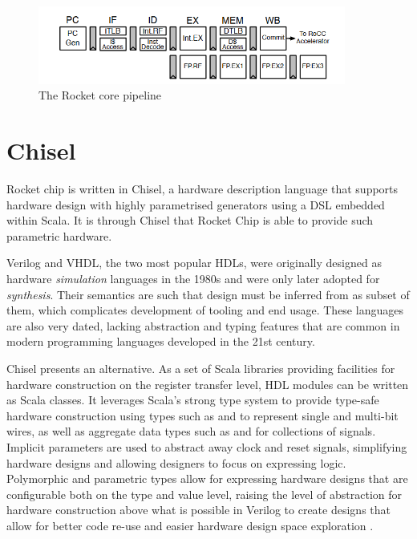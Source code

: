 \begin{figure}[h!]
    \centering
    \includegraphics[width=0.9\textwidth]{../img/rocket-core.png}
    \caption{The Rocket core pipeline \cite{rocketchip} }
    \label{fig:rocket-core}
\end{figure}

\section{Chisel}
Rocket chip is written in Chisel, a hardware description language that supports hardware design with highly parametrised generators using a DSL embedded within Scala. It is through Chisel that Rocket Chip is able to provide such parametric hardware.

Verilog and VHDL, the two most popular HDLs, were originally designed as hardware \textit{simulation} languages in the 1980s and were only later adopted for \textit{synthesis}. Their semantics are such that design must be inferred from as subset of them, which complicates development of tooling and end usage. These languages are also very dated, lacking abstraction and typing features that are common in modern programming languages developed in the 21st century.

Chisel presents an alternative. As a set of Scala libraries providing facilities for hardware construction on the register transfer level, HDL modules can be written as Scala classes. It leverages Scala's strong type system to provide type-safe hardware construction using types such as  and  to represent single and multi-bit wires, as well as aggregate data types such as  and  for collections of signals. Implicit parameters are used to abstract away clock and reset signals, simplifying hardware designs and allowing designers to focus on expressing logic. Polymorphic and parametric types allow for expressing hardware designs that are configurable both on the type and value level, raising the level of abstraction for hardware construction above what is possible in Verilog to create designs that allow for better code re-use and easier hardware design space exploration \cite{chisel}.

